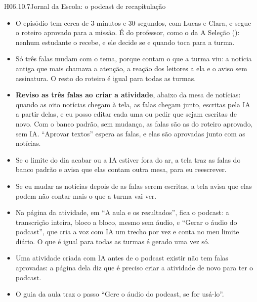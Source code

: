 \begin{historia}{H06.10.7}{Jornal da Escola: o podcast de recapitulação}{\parcial}
\aceite
\begin{itemize}
  \item O episódio tem cerca de 3 minutos e 30 segundos, com Lucas e Clara, e
    segue o roteiro aprovado para a missão. É do professor, como o da A
    Seleção (): nenhum estudante o recebe, e ele decide se e
    quando toca para a turma.
  \item Só três falas mudam com o tema, porque contam o que a turma viu: a
    notícia antiga que mais chamava a atenção, a reação dos leitores a ela e o
    aviso sem assinatura. O resto do roteiro é igual para todas as turmas.
  \item \textbf{Reviso as três falas ao criar a atividade}, abaixo da mesa de
    notícias: quando as oito notícias chegam à tela, as falas chegam junto,
    escritas pela IA a partir delas, e eu posso editar cada uma ou pedir que
    sejam escritas de novo. Com o banco padrão, sem mudança, as falas são as
    do roteiro aprovado, sem IA. \enquote{Aprovar textos} espera as falas, e
    elas são aprovadas junto com as notícias.
  \item Se o limite do dia acabar ou a IA estiver fora do ar, a tela traz as
    falas do banco padrão e avisa que elas contam outra mesa, para eu
    reescrever.
  \item Se eu mudar as notícias depois de as falas serem escritas, a tela avisa
    que elas podem não contar mais o que a turma vai ver.
  \item Na página da atividade, em \enquote{A aula e os resultados}, fica o
    podcast: a transcrição inteira, bloco a bloco, mesmo sem áudio, e
    \enquote{Gerar o áudio do podcast}, que cria a voz com IA um trecho por
    vez e conta no meu limite diário. O que é igual para todas as turmas é
    gerado uma vez só.
  \item Uma atividade criada com IA antes de o podcast existir não tem falas
    aprovadas: a página dela diz que é preciso criar a atividade de novo para
    ter o podcast.
  \item O guia da aula traz o passo \enquote{Gere o áudio do podcast, se for
    usá-lo}.
\end{itemize}
\end{historia}
